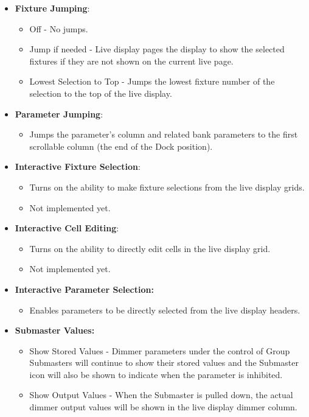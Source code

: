 \documentclass[
]{article}
\providecommand{\tightlist}{%
  \setlength{\itemsep}{0pt}\setlength{\parskip}{0pt}}
\begin{document}
\begin{itemize}
\item
  \textbf{Fixture Jumping}:

  \begin{itemize}
  \item
    Off - No jumps.
  \item
    Jump if needed - Live display pages the display to show the selected fixtures if they are not shown on the current live page.
  \item
    Lowest Selection to Top - Jumps the lowest fixture number of the selection to the top of the live display.
  \end{itemize}
\item
  \textbf{Parameter Jumping}:

  \begin{itemize}
  \tightlist
  \item
    Jumps the parameter's column and related bank parameters to the first scrollable column (the end of the Dock position).
  \end{itemize}
\item
  \textbf{Interactive Fixture Selection}:

  \begin{itemize}
  \tightlist
  \item
    Turns on the ability to make fixture selections from the live display grids.
  \item
    {Not implemented yet.}
  \end{itemize}
\item
  \textbf{Interactive Cell Editing}:

  \begin{itemize}
  \tightlist
  \item
    Turns on the ability to directly edit cells in the live display grid.
  \item
    {Not implemented yet.}
  \end{itemize}
\item
  \textbf{Interactive Parameter Selection:}

  \begin{itemize}
  \tightlist
  \item
    Enables parameters to be directly selected from the live display headers.
  \end{itemize}
\item
  \textbf{Submaster Values:}

  \begin{itemize}
  \item
    Show Stored Values - Dimmer parameters under the control of Group Submasters will continue to show their stored values and the Submaster icon will also be shown to indicate when the parameter is inhibited.
  \item
    Show Output Values - When the Submaster is pulled down, the actual dimmer output values will be shown in the live display dimmer column.
  \end{itemize}
\end{itemize}
\end{document}
